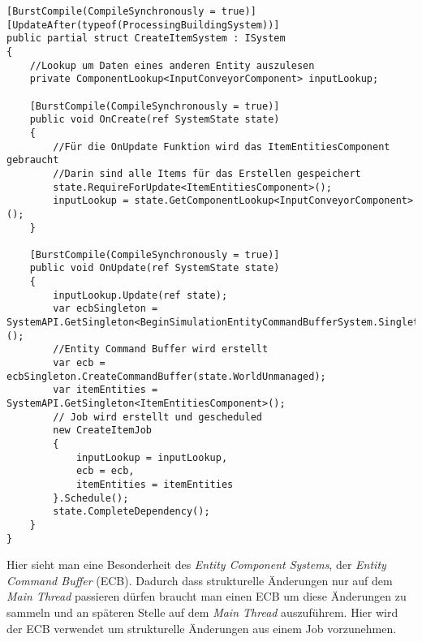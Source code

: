 \begin{lstlisting}[style=code, caption={Create Item System}]
[BurstCompile(CompileSynchronously = true)]
[UpdateAfter(typeof(ProcessingBuildingSystem))]
public partial struct CreateItemSystem : ISystem
{
	//Lookup um Daten eines anderen Entity auszulesen
    private ComponentLookup<InputConveyorComponent> inputLookup;

    [BurstCompile(CompileSynchronously = true)]
    public void OnCreate(ref SystemState state)
    {
      	//Für die OnUpdate Funktion wird das ItemEntitiesComponent gebraucht
      	//Darin sind alle Items für das Erstellen gespeichert
        state.RequireForUpdate<ItemEntitiesComponent>();
        inputLookup = state.GetComponentLookup<InputConveyorComponent>();
    }

    [BurstCompile(CompileSynchronously = true)]
    public void OnUpdate(ref SystemState state)
    {
        inputLookup.Update(ref state);
        var ecbSingleton = SystemAPI.GetSingleton<BeginSimulationEntityCommandBufferSystem.Singleton>();
        //Entity Command Buffer wird erstellt
        var ecb = ecbSingleton.CreateCommandBuffer(state.WorldUnmanaged);
        var itemEntities = SystemAPI.GetSingleton<ItemEntitiesComponent>();
        // Job wird erstellt und gescheduled
        new CreateItemJob
        {
            inputLookup = inputLookup,
            ecb = ecb,
            itemEntities = itemEntities
        }.Schedule();
        state.CompleteDependency();
    }
}
\end{lstlisting}
Hier sieht man eine Besonderheit des \textit{Entity Component Systems}, der \textit{Entity Command Buffer} (ECB). Dadurch dass strukturelle Änderungen nur auf dem \textit{Main Thread} passieren dürfen braucht man einen ECB um diese Änderungen zu sammeln und an späteren Stelle auf dem \textit{Main Thread} auszuführem. Hier wird der ECB verwendet um strukturelle Änderungen aus einem Job vorzunehmen.
